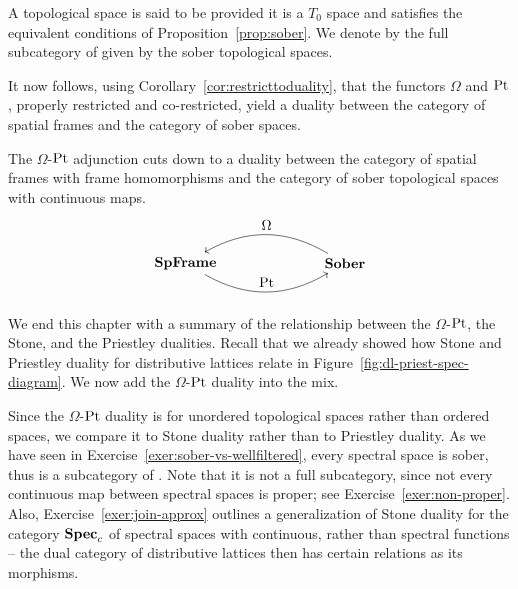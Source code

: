 \begin{definition}\label{def:sober}
A topological space is said to be  provided it is a $T_0$ space and  satisfies the equivalent conditions of Proposition~\ref{prop:sober}. We denote by {\SOB} the full subcategory of {\TOP} given by the sober topological spaces.
\end{definition}

It now follows, using Corollary~\ref{cor:restricttoduality}, that the functors $\Omega$ and $\mathrm{Pt}$, properly restricted and co-restricted, yield a duality between the category of spatial frames and the category of sober spaces.

\begin{theorem}\label{thrm:Omega-Point-duality}
The $\Omega$-$\mathrm{Pt}$ adjunction cuts down to a duality between the category of spatial frames with frame homomorphisms and the category of sober topological spaces with continuous maps.
\[
\begin{tikzpicture}
  \node (A) {{\SpFrame}};
  \node (B) [node distance=4cm, right of=A] { {\SOB}};
  \draw[->,bend right] (A) to node [above,midway] {$\Pt$} (B);
  \draw[->, bend right] (B) to node [above,midway]{$\Omega$} (A);
\end{tikzpicture}
\]
\end{theorem}
We end this chapter with a summary of the relationship between the $\Omega$-$\mathrm{Pt}$, the Stone, and the Priestley dualities. Recall that we already showed how Stone and Priestley duality for distributive lattices relate in Figure~\ref{fig:dl-priest-spec-diagram}. We now add the $\Omega$-$\mathrm{Pt}$ duality into the mix.

Since the $\Omega$-$\mathrm{Pt}$ duality is for unordered topological spaces rather than ordered spaces, we compare it to Stone duality rather than to Priestley duality. As we have seen in Exercise~\ref{exer:sober-vs-wellfiltered}, every spectral space is sober, thus {\Spec} is a subcategory of {\SOB}. Note that it is not a full subcategory, since not every continuous map between spectral spaces is proper; see Exercise~\ref{exer:non-proper}. Also, Exercise~\ref{exer:join-approx} outlines a generalization of Stone duality for the category $\mathbf{Spec}_c$ of spectral spaces with continuous, rather than spectral functions -- the dual category of distributive lattices then has certain relations as its morphisms.

